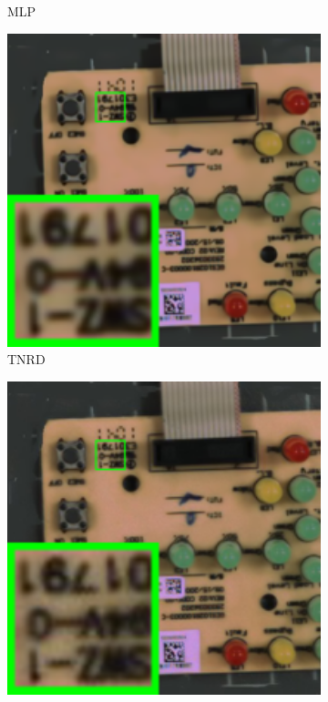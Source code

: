 \begin{figure}
\begin{subfigure}[t]{0.19\textwidth}
\caption{MLP}
    \end{subfigure}
    \hfill
    \begin{subfigure}[t]{0.19\textwidth}
        \centering
        \includegraphics[width=1\textwidth]{images/mcwnnm/nc/resize_br_TNRD_circuit.png}
\caption{TNRD}
    \end{subfigure}
    \hfill
    \begin{subfigure}[t]{0.19\textwidth}
        \centering
        \includegraphics[width=1\textwidth]{images/mcwnnm/nc/resize_br_NI_circuit.png}

\end{subfigure}
\end{figure}
